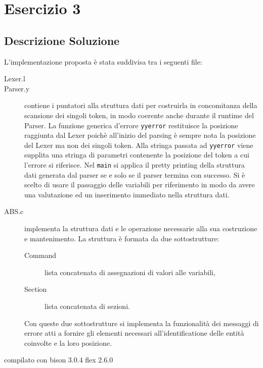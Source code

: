 \documentclass[a4paper,oneside,11pt]{article}
\begin{document}
\section*{Esercizio 3}
\subsection*{Descrizione Soluzione}
L'implementazione proposta è stata suddivisa tra i seguenti file:
\begin{description}
	\item[Lexer.l] 
	\item[Parser.y] contiene i puntatori alla struttura dati per costruirla in concomitanza della scansione dei singoli token, in modo coerente anche durante il runtime del Parser. La funzione generica d'errore \texttt{yyerror} restituisce la posizione raggiunta dal Lexer poichè all'inizio del parsing è sempre nota la posizione del Lexer ma non dei singoli token. Alla stringa passata ad \texttt{yyerror} viene supplita una stringa di parametri contenente la posizione del token a cui l'errore si riferisce. Nel \texttt{main} si applica il pretty printing della struttura dati generata dal parser se e solo se il parser termina con successo. Si è scelto di usare il passaggio delle variabili per riferimento in modo da avere una valutazione ed un inserimento immediato nella struttura dati.
	\item[ABS.c] implementa la struttura dati e le operazione necessarie alla sua costruzione e mantenimento. La struttura è formata da due sottostrutture:
		\begin{description}
			\item[Command] lista concatenata di assegnazioni di valori alle variabili,
			\item[Section] lista concatenata di sezioni.
		\end{description}
		Con queste due sottostrutture si implementa la funzionalità dei messaggi di errore atti a fornire gli elementi necessari all'identificatione delle entità coinvolte e la loro posizione.
\end{description}
compilato con bison 3.0.4
flex 2.6.0
\end{document}
